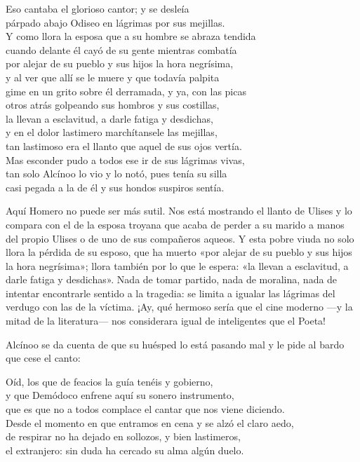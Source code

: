 \begin{versocita}
Eso cantaba el glorioso cantor; y se desleía\\
párpado abajo Odiseo en lágrimas por sus mejillas.\\
Y como llora la esposa que a su hombre se abraza tendida\\
cuando delante él cayó de su gente mientras combatía\\
por alejar de su pueblo y sus hijos la hora negrísima,\\
y al ver que allí se le muere y que todavía palpita\\
gime en un grito sobre él derramada, y ya, con las picas\\
otros atrás golpeando sus hombros y sus costillas,\\
la llevan a esclavitud, a darle fatiga y desdichas,\\
y en el dolor lastimero marchítansele las mejillas,\\
tan lastimoso era el llanto que aquel de sus ojos vertía.\\
Mas esconder pudo a todos ese ir de sus lágrimas vivas,\\
tan solo Alcínoo lo vio y lo notó, pues tenía su silla\\
casi pegada a la de él y sus hondos suspiros sentía.
\end{versocita}

Aquí Homero no puede ser más sutil. Nos está mostrando el llanto de Ulises y lo compara con el de la esposa troyana que acaba de perder a su marido a manos del propio Ulises o de uno de sus compañeros aqueos. Y esta pobre viuda no solo llora la pérdida de su esposo, que ha muerto «por alejar de su pueblo y sus hijos la hora negrísima»; llora también por lo que le espera: «la llevan a esclavitud, a darle fatiga y desdichas». Nada de tomar partido, nada de moralina, nada de intentar encontrarle sentido a la tragedia: se limita a igualar las lágrimas del verdugo con las de la víctima. ¡Ay, qué hermoso sería que el cine moderno ---y la mitad de la literatura--- nos considerara igual de inteligentes que el Poeta!


Alcínoo se da cuenta de que su huésped lo está pasando mal y le pide al bardo que cese el canto:

\begin{versocita}
Oíd, los que de feacios la guía tenéis y gobierno,\\
y que Demódoco enfrene aquí su sonero instrumento,\\
que es que no a todos complace el cantar que nos viene diciendo.\\
Desde el momento en que entramos en cena y se alzó el claro aedo,\\
de respirar no ha dejado en sollozos, y bien lastimeros,\\
el extranjero: sin duda ha cercado su alma algún duelo.
\end{versocita}

